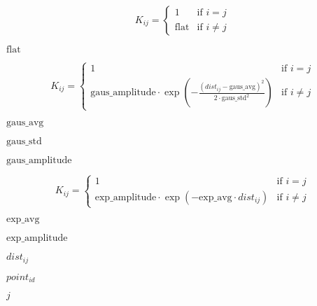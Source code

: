 \documentclass{article}
\begin{document}
\[
 K_{ij} = \begin{cases}
 1 & \text{if } i = j \\
 \text{flat} & \text{if } i \neq j
 \end{cases}
 \]
\pagebreak

$ \text{flat} $
\pagebreak

\[
K_{ij} = \begin{cases}
1 & \text{if } i = j \\
\text{gaus_amplitude} \cdot \exp \left( - \frac{(dist_{ij} - \text{gaus_avg})^2}{2 \cdot \text{gaus_std}^2} \right) & \text{if } i \neq j
\end{cases}
\]
\pagebreak

$ \text{gaus_avg} $
\pagebreak

$ \text{gaus_std} $
\pagebreak

$ \text{gaus_amplitude} $
\pagebreak

\[
K_{ij} = \begin{cases}
1 & \text{if } i = j \\
\text{exp_amplitude} \cdot \exp \left( - \text{exp_avg} \cdot dist_{ij} \right) & \text{if } i \neq j
\end{cases}
\]
\pagebreak

$ \text{exp_avg} $
\pagebreak

$ \text{exp_amplitude} $
\pagebreak

$ dist_{ij} $
\pagebreak

$ point_{id} $
\pagebreak

$ j $
\pagebreak
\end{document}
